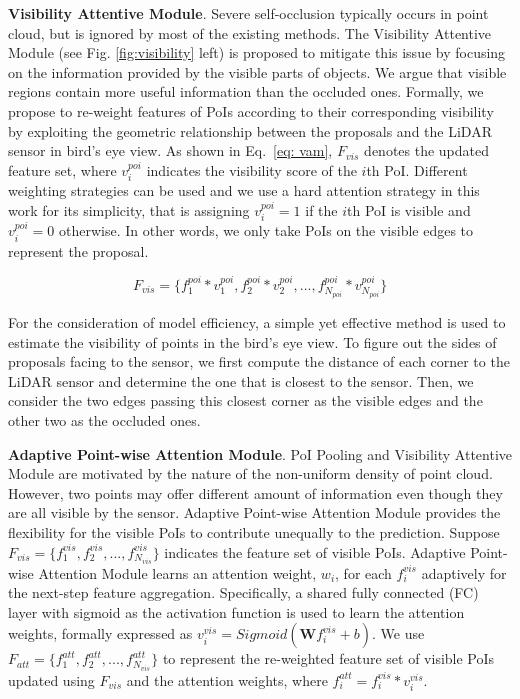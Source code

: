 \documentclass[runningheads]{llncs}
\begin{document}
\noindent\textbf{Visibility Attentive Module}.
Severe self-occlusion typically occurs in point cloud, but is ignored by most of the existing methods. The Visibility Attentive Module (see Fig. \ref{fig:visibility} left) is proposed to mitigate this issue by focusing on the information provided by the visible parts of objects. We argue that visible regions contain more useful information than the occluded ones. Formally, we propose to re-weight features of PoIs according to their corresponding visibility by exploiting the geometric relationship between the proposals and the LiDAR sensor in bird’s eye view. As shown in Eq.~\ref{eq: vam}, $F_{vis}$ denotes the updated feature set, where $v^{poi}_i$ indicates the visibility score of the $i$th PoI. Different weighting strategies can be used and we use a hard attention strategy in this work for its simplicity, that is assigning $v^{poi}_i=1$ if the $i$th PoI is visible and $v^{poi}_i=0$ otherwise. In other words, we only take PoIs on the visible edges to represent the proposal. 

\begin{equation}
\label{eq: vam}
F_{vis} = \{ f^{poi}_1 * v^{poi}_1, f^{poi}_2 * v^{poi}_2,..., f^{poi}_{N_{poi}} * v^{poi}_{N_{poi}}\}
\end{equation}

For the consideration of model efficiency, a simple yet effective method is used to estimate the visibility of points in the bird's eye view. To figure out the sides of proposals facing to the sensor, we first compute the distance of each corner to the LiDAR sensor and determine the one that is closest to the sensor. Then, we consider the two edges passing this closest corner as the visible edges and the other two as the occluded ones. 

\noindent\textbf{Adaptive Point-wise Attention Module}.
PoI Pooling and Visibility Attentive Module are motivated by the nature of the non-uniform density of point cloud. However, two points may offer different amount of information even though they are all visible by the sensor. Adaptive Point-wise Attention Module provides the flexibility for the visible PoIs to contribute unequally to the prediction. Suppose $F_{vis} = \{ f^{vis}_{1}, f^{vis}_{2}, ..., f^{vis}_{N_{vis}} \}$ indicates the feature set of visible PoIs. Adaptive Point-wise Attention Module learns an attention weight, $w_i$, for each $f^{vis}_i$ adaptively for the next-step feature aggregation. Specifically, a shared fully connected (FC) layer with sigmoid as the activation function is used to learn the attention weights, formally expressed as $v^{vis}_i = Sigmoid(\textbf{W}f^{vis}_i+b)$. We use $F_{att}=\{ f^{att}_{1}, f^{att}_{2}, ..., f^{att}_{N_{vis}} \}$ to represent the re-weighted feature set of visible PoIs updated using $F_{vis}$ and the attention weights, where $f^{att}_i=f^{vis}_i*v^{vis}_i$.
 
\end{document}

